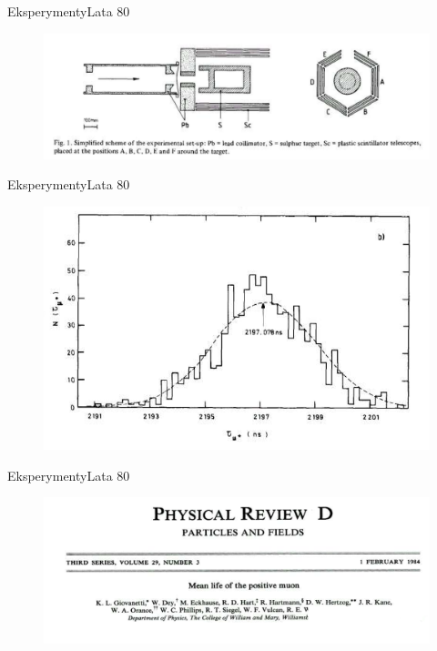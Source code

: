 \documentclass[xcolor={dvipsnames}]{beamer}
\begin{document}
\begin{frame}{Eksperymenty}{Lata 80}
    
    \begin{figure}
        \includegraphics[scale=0.7]{positive2_bardin.PNG}
    \end{figure}

\end{frame}

\begin{frame}{Eksperymenty}{Lata 80}
    
    \begin{figure}
        \includegraphics[scale=0.9]{positive3_bardin.PNG}
    \end{figure}

\end{frame}

\begin{frame}{Eksperymenty}{Lata 80}
    
    \begin{figure}
        \includegraphics[scale=0.7]{giovani1.PNG}
    \end{figure}

\end{frame}
\end{document}
